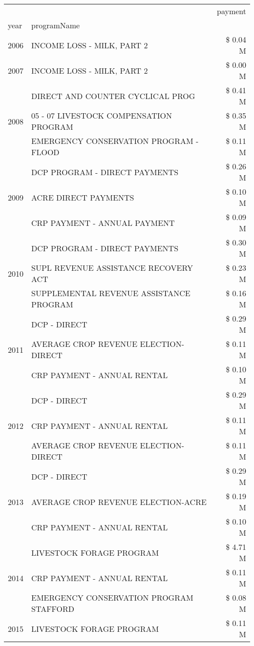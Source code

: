 \begin{tabular}{llr}
\toprule
 &  & payment \\
year & programName &  \\
\midrule
2006 & INCOME LOSS - MILK, PART 2 & \$ 0.04 M \\
\cline{1-3}
2007 & INCOME LOSS - MILK, PART 2 & \$ 0.00 M \\
\cline{1-3}
\multirow[t]{3}{*}{2008} & DIRECT AND COUNTER CYCLICAL PROG & \$ 0.41 M \\
 & 05 - 07 LIVESTOCK COMPENSATION PROGRAM & \$ 0.35 M \\
 & EMERGENCY CONSERVATION PROGRAM - FLOOD & \$ 0.11 M \\
\cline{1-3}
\multirow[t]{3}{*}{2009} & DCP PROGRAM - DIRECT PAYMENTS & \$ 0.26 M \\
 & ACRE DIRECT PAYMENTS & \$ 0.10 M \\
 & CRP PAYMENT - ANNUAL PAYMENT & \$ 0.09 M \\
\cline{1-3}
\multirow[t]{3}{*}{2010} & DCP PROGRAM - DIRECT PAYMENTS & \$ 0.30 M \\
 & SUPL REVENUE ASSISTANCE RECOVERY ACT & \$ 0.23 M \\
 & SUPPLEMENTAL REVENUE ASSISTANCE PROGRAM & \$ 0.16 M \\
\cline{1-3}
\multirow[t]{3}{*}{2011} & DCP - DIRECT & \$ 0.29 M \\
 & AVERAGE CROP REVENUE ELECTION-DIRECT & \$ 0.11 M \\
 & CRP PAYMENT - ANNUAL RENTAL & \$ 0.10 M \\
\cline{1-3}
\multirow[t]{3}{*}{2012} & DCP - DIRECT & \$ 0.29 M \\
 & CRP PAYMENT - ANNUAL RENTAL & \$ 0.11 M \\
 & AVERAGE CROP REVENUE ELECTION-DIRECT & \$ 0.11 M \\
\cline{1-3}
\multirow[t]{3}{*}{2013} & DCP - DIRECT & \$ 0.29 M \\
 & AVERAGE CROP REVENUE ELECTION-ACRE & \$ 0.19 M \\
 & CRP PAYMENT - ANNUAL RENTAL & \$ 0.10 M \\
\cline{1-3}
\multirow[t]{3}{*}{2014} & LIVESTOCK FORAGE PROGRAM & \$ 4.71 M \\
 & CRP PAYMENT - ANNUAL RENTAL & \$ 0.11 M \\
 & EMERGENCY CONSERVATION PROGRAM STAFFORD & \$ 0.08 M \\
\cline{1-3}
\multirow[t]{3}{*}{2015} & LIVESTOCK FORAGE PROGRAM & \$ 0.11 M \\

\end{tabular}
